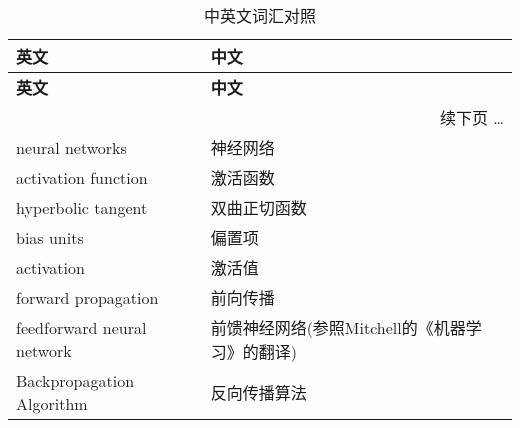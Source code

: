 %


\section{}


\subsection{}


\begin{longtable}[h]{m{}m{}}
\caption{中英文词汇对照} \label{tab:zhendict} \\
\toprule
\textbf{英文}&\textbf{中文} \\
\midrule
\endfirsthead  %
\midrule
\textbf{英文}&\textbf{中文} \\
\midrule
\endhead %
\multicolumn{2}{r}{续下页 \dots} \\
\midrule

\endfoot %
\endlastfoot

neural networks & 神经网络 \\
  \midrule

activation function & 激活函数 \\
  \midrule

hyperbolic tangent & 双曲正切函数 \\
  \midrule

bias units & 偏置项 \\
  \midrule

activation & 激活值 \\
  \midrule

forward propagation & 前向传播 \\
  \midrule

feedforward neural network & 前馈神经网络(参照Mitchell的《机器学习》的翻译) \\
  \midrule

Backpropagation Algorithm & 反向传播算法 \\
  \midrule


\end{longtable}
